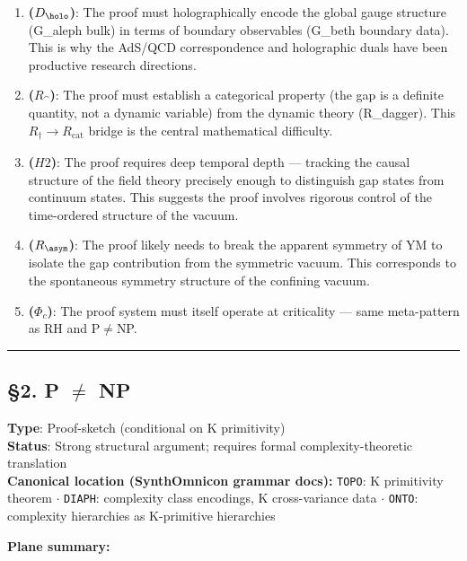 \documentclass[12pt,a4paper]{article}
\newcommand{\pilcrow}{\S}
\begin{document}
\begin{enumerate}
    \item \textbf{($D_{\holo}$)}: The proof must holographically encode the global gauge structure (G\_aleph bulk) in terms of boundary observables (G\_beth boundary data). This is why the AdS/QCD correspondence and holographic duals have been productive research directions.
    \item \textbf{($R_{\cat}$)}: The proof must establish a categorical property (the gap is a definite quantity, not a dynamic variable) from the dynamic theory (R\_dagger). This $R_{\dagger} \to R_{\text{cat}}$ bridge is the central mathematical difficulty.
    \item \textbf{($H2$)}: The proof requires deep temporal depth --- tracking the causal structure of the field theory precisely enough to distinguish gap states from continuum states. This suggests the proof involves rigorous control of the time-ordered structure of the vacuum.
    \item \textbf{($R_{\asym}$)}: The proof likely needs to break the apparent symmetry of YM to isolate the gap contribution from the symmetric vacuum. This corresponds to the spontaneous symmetry structure of the confining vacuum.
    \item \textbf{($\Phi_c$)}: The proof system must itself operate at criticality --- same meta-pattern as RH and P$\neq$NP.
\end{enumerate}

\begin{center}
\rule{0.5\textwidth}{0.4pt}
\end{center}

\subsection{\pilcrow{}2. P $\neq$ NP}

\textbf{Type}: Proof-sketch (conditional on K primitivity)   \\
\textbf{Status}: Strong structural argument; requires formal complexity-theoretic translation   \\
\textbf{Canonical location (SynthOmnicon grammar docs):} \texttt{TOPO}: K primitivity theorem $\cdot$ \texttt{DIAPH}: complexity class encodings, K cross-variance data $\cdot$ \texttt{ONTO}: complexity hierarchies as K-primitive hierarchies

\textbf{Plane summary:}
\end{document}
